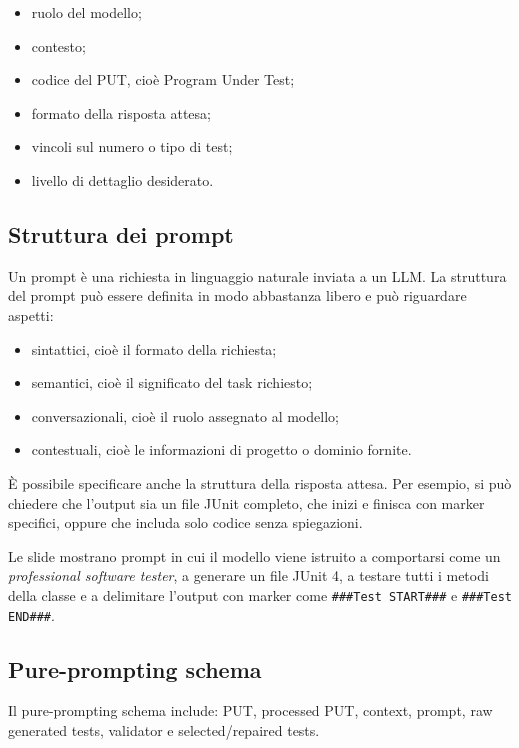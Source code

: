 \begin{itemize}
    \item ruolo del modello;
    \item contesto;
    \item codice del PUT, cioè Program Under Test;
    \item formato della risposta attesa;
    \item vincoli sul numero o tipo di test;
    \item livello di dettaglio desiderato.
\end{itemize}
\subsection{Struttura dei prompt}

Un prompt è una richiesta in linguaggio naturale inviata a un LLM. La struttura del prompt può essere definita in modo abbastanza libero e può riguardare aspetti:

\begin{itemize}
    \item sintattici, cioè il formato della richiesta;
    \item semantici, cioè il significato del task richiesto;
    \item conversazionali, cioè il ruolo assegnato al modello;
    \item contestuali, cioè le informazioni di progetto o dominio fornite.
\end{itemize}

È possibile specificare anche la struttura della risposta attesa. Per esempio, si può chiedere che l'output sia un file JUnit completo, che inizi e finisca con marker specifici, oppure che includa solo codice senza spiegazioni.

\begin{notaslide}
Le slide mostrano prompt in cui il modello viene istruito a comportarsi come un \emph{professional software tester}, a generare un file JUnit 4, a testare tutti i metodi della classe e a delimitare l'output con marker come \texttt{\#\#\#Test START\#\#\#} e \texttt{\#\#\#Test END\#\#\#}.
\end{notaslide}

\subsection{Pure-prompting schema}

\begin{notaslide}
Il pure-prompting schema include: PUT, processed PUT, context, prompt, raw generated tests, validator e selected/repaired tests.
\end{notaslide}

